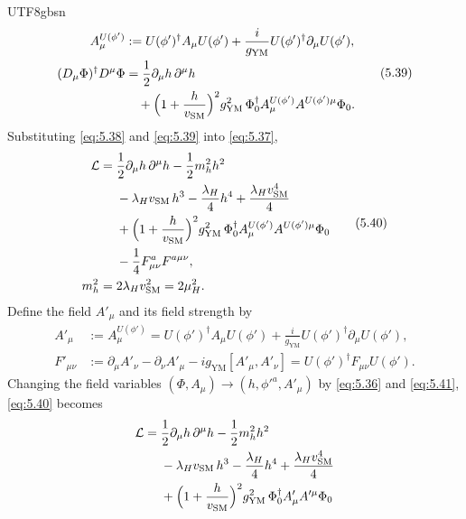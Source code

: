 \documentclass[11pt,a4paper,oneside]{report}
\begin{document}
\begin{CJK*}{UTF8}{gbsn}
\begin{equation*}
\begin{aligned}
A^{U(\phi')}_\mu&:=U(\phi')^\dagger A_\mu U(\phi')+\frac i{g_{\mathrm{YM}}}U(\phi')^\dagger\partial_\mu U(\phi'),\\
(D_\mu\Phi)^\dagger D^\mu\Phi&=\frac12\partial_\mu h\,\partial^\mu h\\
&\quad+\Bigl(1+\frac h{v_{\mathrm{SM}}}\Bigr)^2g_{\mathrm{YM}}^2\,\Phi_0^\dagger A^{U(\phi')}_\mu A^{U(\phi')\mu}\Phi_0 .
\end{aligned}
\tag{5.39}\label{eq:5.39}
\end{equation*}
Substituting \eqref{eq:5.38} and \eqref{eq:5.39} into \eqref{eq:5.37},
\begin{equation*}
{\displaystyle 
\begin{aligned}
\mathcal L={}&\frac12\partial_\mu h\,\partial^\mu h-\frac12m_h^2h^2\\
&-\lambda_Hv_{\mathrm{SM}}\,h^3-\frac{\lambda_H}4h^4+\frac{\lambda_Hv_{\mathrm{SM}}^4}4\\
&+\Bigl(1+\frac h{v_{\mathrm{SM}}}\Bigr)^2g_{\mathrm{YM}}^2\,\Phi_0^\dagger A^{U(\phi')}_\mu A^{U(\phi')\mu}\Phi_0\\
&-\frac14F_{\mu\nu}^aF^{a\mu\nu},\\
m_h^2={}&2\lambda_Hv_{\mathrm{SM}}^2=2\mu_H^2 .
\end{aligned}
}
\tag{5.40}\label{eq:5.40}
\end{equation*}
Define the field $A'_\mu$ and its field strength by
\begin{equation*}
\begin{aligned}
A'_\mu&:=A^{U(\phi')}_\mu=U(\phi')^\dagger A_\mu U(\phi')+\frac i{g_{\mathrm{YM}}}U(\phi')^\dagger\partial_\mu U(\phi'),\\
F'_{\mu\nu}&:=\partial_\mu A'_\nu-\partial_\nu A'_\mu-ig_{\mathrm{YM}}[A'_\mu,A'_\nu]=U(\phi')^\dagger F_{\mu\nu}U(\phi') .
\end{aligned}
\tag{5.41}\label{eq:5.41}
\end{equation*}
Changing the field variables $(\Phi,A_\mu)\to(h,\phi'^a,A'_\mu)$ by \eqref{eq:5.36} and \eqref{eq:5.41}, \eqref{eq:5.40} becomes
\begin{equation*}
{\displaystyle 
\begin{aligned}
\mathcal L={}&\frac12\partial_\mu h\,\partial^\mu h-\frac12m_h^2h^2\\
&-\lambda_Hv_{\mathrm{SM}}\,h^3-\frac{\lambda_H}4h^4+\frac{\lambda_Hv_{\mathrm{SM}}^4}4\\
&+\Bigl(1+\frac h{v_{\mathrm{SM}}}\Bigr)^2g_{\mathrm{YM}}^2\,\Phi_0^\dagger A'_\mu A'^\mu\Phi_0\\

\end{aligned}}
\end{equation*}
\end{CJK*}
\end{document}
